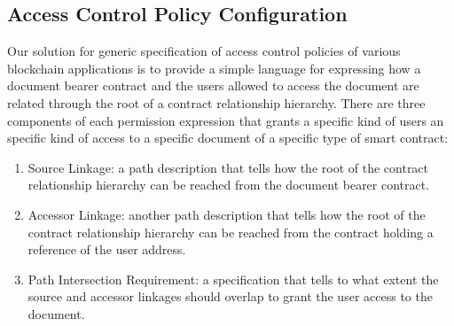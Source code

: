 \subsection{Access Control Policy Configuration}
Our solution for generic specification of access control policies of various blockchain applications is to provide a simple language for expressing how a document bearer contract and the users allowed to access the document are related through the root of a contract relationship hierarchy. There are three components of each permission expression that grants a specific kind of users an specific kind of access to a specific document of a specific type of smart contract:
\begin{enumerate}
\item Source Linkage: a path description that tells how the root of the contract relationship hierarchy can be reached from the document bearer contract.
\item Accessor Linkage: another path description that tells how the root of the contract relationship hierarchy can be reached from the contract holding a reference of the user address.
\item Path Intersection Requirement: a specification that tells to what extent the source and accessor linkages should overlap to grant the user access to the document.     
\end{enumerate}            

